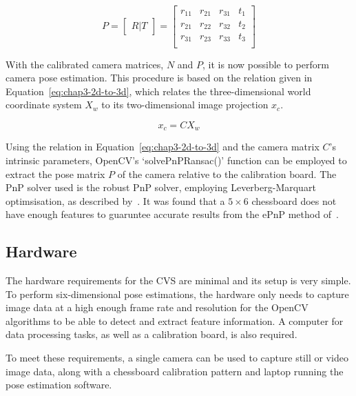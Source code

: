\begin{equation}
  \label{eq:chap3-cam-extrinsic}
  P = 
  \begin{bmatrix}
    R | T
  \end{bmatrix}
  =
  \begin{bmatrix}
    r_{11} & r_{21} & r_{31} & t_1 \\
    r_{21} & r_{22} & r_{32} & t_2 \\
    r_{31} & r_{23} & r_{33} & t_3 \\
  \end{bmatrix}
\end{equation}

With the calibrated camera matrices, $N$ and $P$, it is now possible to perform camera pose estimation. This procedure is based on the relation given in Equation~\ref{eq:chap3-2d-to-3d}, which relates the three-dimensional world coordinate system $X_w$ to its two-dimensional image projection $x_c$.  

\begin{equation}
   \label{eq:chap3-2d-to-3d}
   x_c
   = C
   X_w
\end{equation}

Using the relation in Equation~\ref{eq:chap3-2d-to-3d} and the camera matrix $C$'s intrinsic parameters, OpenCV's `solvePnPRansac()' function can be employed to extract the pose matrix $P$ of the camera relative to the calibration board. The PnP solver used is the robust PnP solver, employing Leverberg-Marquart optimsisation, as described by~\cite{schweighofer2006robust}. It was found that a $5\times6$ chessboard does not have enough features to guaruntee accurate results from the ePnP method of~\cite{lepetit2009epnp}.

\subsection{Hardware}

The hardware requirements for the CVS are minimal and its setup is very simple. To perform six-dimensional pose estimations, the hardware only needs to capture image data at a high enough frame rate and resolution for the OpenCV algorithms to be able to detect and extract feature information. A computer for data processing tasks, as well as a calibration board, is also required. 

To meet these requirements, a single camera can be used to capture still or video image data, along with a chessboard calibration pattern and laptop running the pose estimation software.  

